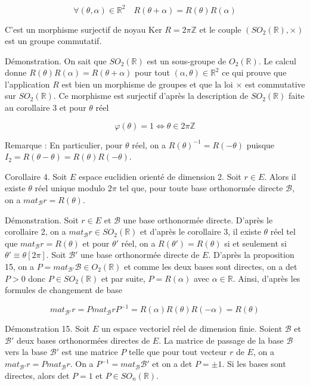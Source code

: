 \[
\forall (\theta, \alpha) \in \mathbb{R}^2 \quad R(\theta + \alpha) = R(\theta)R(\alpha)
\]

C'est un morphisme surjectif de noyau Ker $R = 2\pi \mathbb{Z}$ et le couple $(SO_2(\mathbb{R}), \times)$ est un groupe commutatif.

Démonstration. On sait que $SO_2(\mathbb{R})$ est un sous-groupe de $O_2(\mathbb{R})$. Le calcul donne $R(\theta)R(\alpha) = R(\theta + \alpha)$ pour tout $(\alpha, \theta) \in \mathbb{R}^2$ ce qui prouve que l'application $R$ est bien un morphisme de groupes et que la loi $\times$ est commutative sur $SO_2(\mathbb{R})$. Ce morphisme est surjectif d'après la description de $SO_2(\mathbb{R})$ faite au corollaire 3 et pour $\theta$ réel

\[
\varphi(\theta) = 1 \Leftrightarrow \theta \in 2\pi \mathbb{Z}
\]

Remarque : En particulier, pour $\theta$ réel, on a $R(\theta)^{-1} = R(-\theta)$ puisque $I_2 = R(\theta - \theta) = R(\theta)R(-\theta)$.

Corollaire 4. Soit $E$ espace euclidien orienté de dimension 2. Soit $r \in E$. Alors il existe $\theta$ réel unique modulo $2\pi$ tel que, pour toute base orthonormée directe $\mathcal{B}$, on a $mat_{\mathcal{B}} r = R(\theta)$.

Démonstration. Soit $r \in E$ et $\mathcal{B}$ une base orthonormée directe. D'après le corollaire 2, on a $mat_{\mathcal{B}} r \in SO_2(\mathbb{R})$ et d'après le corollaire 3, il existe $\theta$ réel tel que $mat_{\mathcal{B}} r = R(\theta)$ et pour $\theta'$ réel, on a $R(\theta') = R(\theta)$ si et seulement si $\theta' \equiv \theta [2\pi]$. Soit $\mathcal{B}'$ une base orthonormée directe de $E$. D'après la proposition 15, on a $P = mat_{\mathcal{B}'} \mathcal{B} \in O_2(\mathbb{R})$ et comme les deux bases sont directes, on a det $P > 0$ donc $P \in SO_2(\mathbb{R})$ et par suite, $P = R(\alpha)$ avec $\alpha \in \mathbb{R}$. Ainsi, d'après les formules de changement de base

\[
mat_{\mathcal{B}'} r = P mat_{\mathcal{B}} r P^{-1} = R(\alpha) R(\theta) R(-\alpha) = R(\theta)
\]

Démonstration 15. Soit $E$ un espace vectoriel réel de dimension finie. Soient $\mathcal{B}$ et $\mathcal{B}'$ deux bases orthonormées directes de $E$. La matrice de passage de la base $\mathcal{B}$ vers la base $\mathcal{B}'$ est une matrice $P$ telle que pour tout vecteur $r$ de $E$, on a $mat_{\mathcal{B}'} r = P mat_{\mathcal{B}} r$. On a $P^{-1} = mat_{\mathcal{B}} \mathcal{B}'$ et on a det $P = \pm 1$. Si les bases sont directes, alors det $P = 1$ et $P \in SO_n(\mathbb{R})$.

